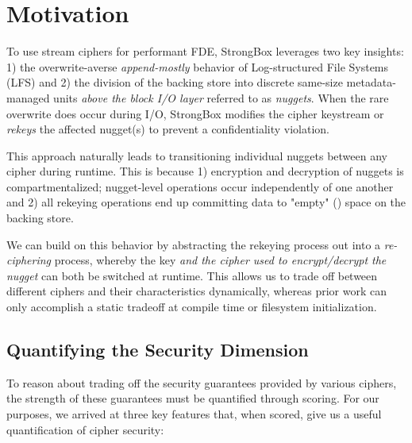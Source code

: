 \section{Motivation}\label{sec:motivation}


To use stream ciphers for performant FDE, StrongBox leverages two key insights:
1) the overwrite-averse \emph{append-mostly} behavior of Log-structured File
Systems (LFS) and 2) the division of the backing store into discrete same-size
metadata-managed units \emph{above the block I/O layer} referred to as
\emph{nuggets}. When the rare overwrite does occur during I/O, StrongBox
modifies the cipher keystream or \emph{rekeys} the affected nugget(s) to prevent
a confidentiality violation.

This approach naturally leads to transitioning individual nuggets between any
cipher during runtime. This is because 1) encryption and decryption of nuggets
is compartmentalized; nugget-level operations occur independently of one another
and 2) all rekeying operations end up committing data to "empty"
() space on the backing store.

We can build on this behavior by abstracting the rekeying process out into a
\emph{re-ciphering} process, whereby the key \emph{and the cipher used to
encrypt/decrypt the nugget} can both be switched at runtime. This allows us to
trade off between different ciphers and their characteristics dynamically,
whereas prior work can only accomplish a static tradeoff at compile time or
filesystem initialization.

\subsection{Quantifying the Security Dimension}

To reason about trading off the security guarantees provided by various ciphers,
the strength of these guarantees must be quantified through scoring. For our
purposes, we arrived at three key features that, when scored, give us a useful
quantification of cipher security:

